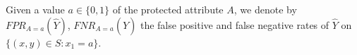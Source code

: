 Given a value $a \in \{0,1\}$ of the protected attribute $A$, we denote by $FPR_{A = a}(\hat{Y})$, $FNR_{A = a}(\hat{Y})$ the false positive and false negative rates of $\hat{Y}$ on $\{(x,y) \in S : x_1 = a\}$.








